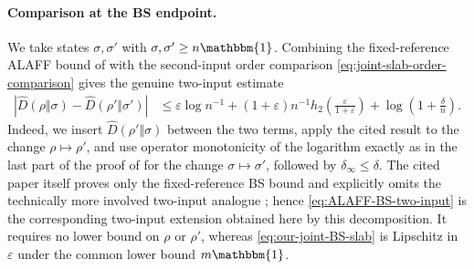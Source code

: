 \documentclass[11pt]{article}
\theoremstyle{remark}
\newcommand{\1}{\mathbbm{1}}
\begin{document}
\paragraph{Comparison at the BS endpoint.}
We take states $\sigma,\sigma'$ with
$\sigma,\sigma'\geq n\1$.  Combining the fixed-reference ALAFF
bound of \cite[Corollary~6.13]{bluhm2023continuity} with the
second-input order comparison
\eqref{eq:joint-slab-order-comparison} gives the genuine two-input
estimate
\begin{equation}
 \begin{aligned}
 |\widehat D(\rho\Vert\sigma)
       -\widehat D(\rho'\Vert\sigma')|
 &\leq\varepsilon\log n^{-1}
 +(1+\varepsilon)n^{-1}
 h_2\!\left(\frac{\varepsilon}{1+\varepsilon}\right)
 +\log\left(1+\frac{\delta}{n}\right).
 \end{aligned}
 \label{eq:ALAFF-BS-two-input}
\end{equation}
Indeed, we insert $\widehat D(\rho'\Vert\sigma)$ between the two terms,
apply the cited result to the change $\rho\mapsto\rho'$, and use
operator monotonicity of the logarithm exactly as in the last part of
the proof of  for the change
$\sigma\mapsto\sigma'$, followed by
$\delta_\infty\leq\delta$.  The cited paper itself proves only the
fixed-reference BS bound and explicitly omits the technically more
involved two-input analogue
\cite[Section~6.2.4]{bluhm2023continuity}; hence
\eqref{eq:ALAFF-BS-two-input} is the corresponding two-input extension
obtained here by this decomposition.  It requires no lower bound on
$\rho$ or $\rho'$, whereas \eqref{eq:our-joint-BS-slab} is Lipschitz
in $\varepsilon$ under the common lower bound $m\1$.
\end{document}
